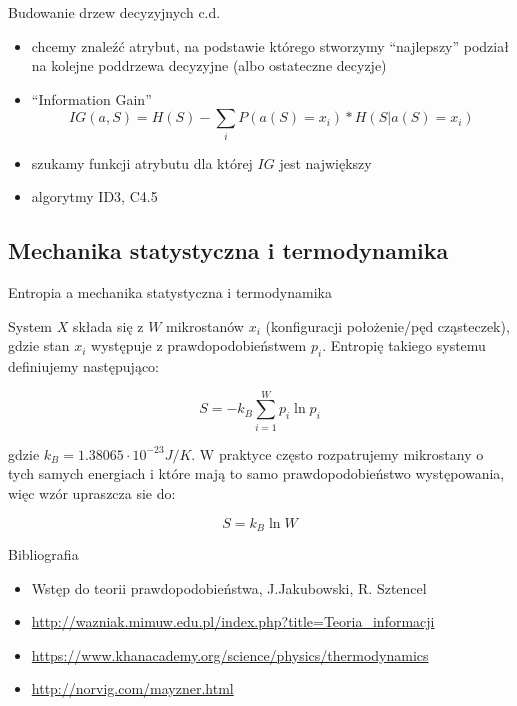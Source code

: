 \documentclass{beamer}
\begin{document}
\begin{frame}{Budowanie drzew decyzyjnych c.d.}
\begin{itemize}
\item chcemy znaleźć atrybut, na podstawie którego stworzymy ``najlepszy'' podział
na kolejne poddrzewa decyzyjne (albo ostateczne decyzje)
\item ``Information Gain''
$$
IG(a, S) = H(S) - \sum_{i} P(a(S) = x_i) * H(S| a(S) = x_i)
$$
\item szukamy funkcji atrybutu dla której $IG$ jest największy
\item algorytmy ID3, C4.5
\end{itemize}
\end{frame}


\subsection{Mechanika statystyczna i termodynamika}

\begin{frame}{Entropia a mechanika statystyczna i termodynamika}

System $X$ składa się z $W$ mikrostanów $x_i$ (konfiguracji położenie/pęd cząsteczek), gdzie stan
$x_i$ występuje z prawdopodobieństwem $p_i$. Entropię takiego systemu definiujemy
następująco:

$$
S = - k_B \sum_{i=1}^{W} p_i \ln{p_i}
$$

gdzie $k_B = 1.38065 \cdot 10^{-23} J/K$.
W praktyce często rozpatrujemy mikrostany o tych samych energiach i które mają
to samo prawdopodobieństwo występowania, więc wzór upraszcza sie do:

$$
S = k_B \ln{W}
$$

\end{frame}

\begin{frame}{Bibliografia}
\begin{itemize}
  \item Wstęp do teorii prawdopodobieństwa, J.Jakubowski, R. Sztencel
  \item \url{http://wazniak.mimuw.edu.pl/index.php?title=Teoria_informacji}
  \item \url{https://www.khanacademy.org/science/physics/thermodynamics}
  \item \url{http://norvig.com/mayzner.html}
\end{itemize}
\end{frame}
\end{document}
